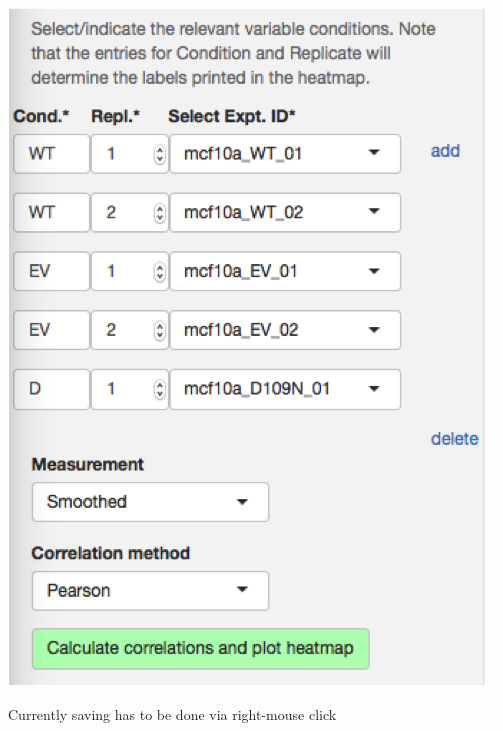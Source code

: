 \documentclass[letterpaper, twocolumn, 9pt]{article}
\begin{document}
\includegraphics[width=\columnwidth]{figures/ss_correlations01.png}


Currently saving has to be done via right-mouse click
\end{document}
